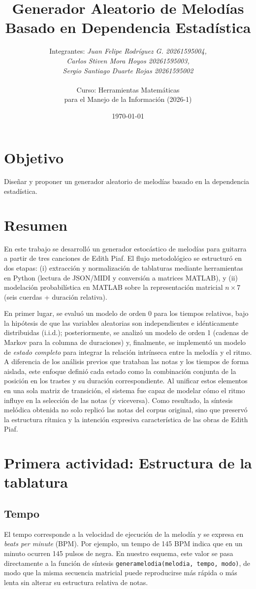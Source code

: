 \documentclass{article}
\title{Generador Aleatorio de Melodías Basado en Dependencia Estadística}
\author{Integrantes: 
    \textit{Juan Felipe Rodríguez G. 20261595004,} \\ 
    \textit{Carlos Stiven Mora Hoyos 20261595003,} \\ 
    \textit{Sergio Santiago Duarte Rojas 20261595002} \\
    \\Curso: Herramientas Matemáticas \\para el Manejo de la Información (2026-1)}
\date{\today}
\theoremstyle{plain}
\theoremstyle{definition}
\begin{document}
\maketitle

\section*{Objetivo}
Diseñar y proponer un generador aleatorio de melodías basado en la dependencia estadística.

\section*{Resumen}
En este trabajo se desarrolló un generador estocástico de melodías para guitarra a partir de tres canciones de Edith Piaf. El flujo metodológico se estructuró en dos etapas: (i) extracción y normalización de tablaturas mediante herramientas en Python (lectura de JSON/MIDI y conversión a matrices MATLAB), y (ii) modelación probabilística en MATLAB sobre la representación matricial $n \times 7$ (seis cuerdas + duración relativa). 

En primer lugar, se evaluó un modelo de orden 0 para los tiempos relativos, bajo la hipótesis de que las variables aleatorias son independientes e idénticamente distribuidas (i.i.d.); posteriormente, se analizó un modelo de orden 1 (cadenas de Markov para la columna de duraciones) y, finalmente, se implementó un modelo de \textit{estado completo} para integrar la relación intrínseca entre la melodía y el ritmo. A diferencia de los análisis previos que trataban las notas y los tiempos de forma aislada, este enfoque definió cada estado como la combinación conjunta de la posición en los trastes y su duración correspondiente. Al unificar estos elementos en una sola matriz de transición, el sistema fue capaz de modelar cómo el ritmo influye en la selección de las notas (y viceversa). Como resultado, la síntesis melódica obtenida no solo replicó las notas del corpus original, sino que preservó la estructura rítmica y la intención expresiva característica de las obras de Edith Piaf.

\section*{Primera actividad: Estructura de la tablatura}
\subsection*{Tempo}
El tempo corresponde a la velocidad de ejecución de la melodía y se expresa en \textit{beats per minute} (BPM). Por ejemplo, un tempo de 145 BPM indica que en un minuto ocurren 145 pulsos de negra. En nuestro esquema, este valor se pasa directamente a la función de síntesis \texttt{generamelodia(melodia, tempo, modo)}, de modo que la misma secuencia matricial puede reproducirse más rápida o más lenta sin alterar su estructura relativa de notas.
\end{document}
